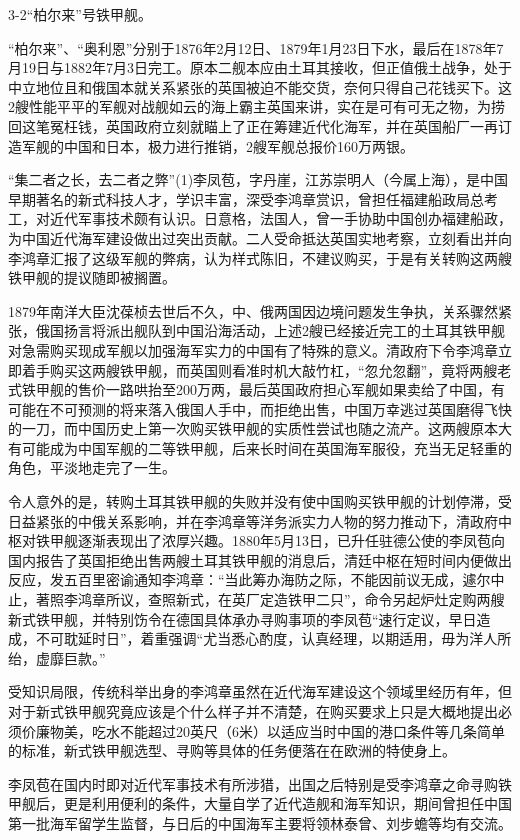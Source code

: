 \documentclass[12pt,UTF8]{ctexbook}
\begin{document}
3-2“柏尔来”号铁甲舰。

“柏尔来”、“奥利恩”分别于1876年2月12日、1879年1月23日下水，最后在1878年7月19日与1882年7月3日完工。原本二舰本应由土耳其接收，但正值俄土战争，处于中立地位且和俄国本就关系紧张的英国被迫不能交货，奈何只得自己花钱买下。这2艘性能平平的军舰对战舰如云的海上霸主英国来讲，实在是可有可无之物，为捞回这笔冤枉钱，英国政府立刻就瞄上了正在筹建近代化海军，并在英国船厂一再订造军舰的中国和日本，极力进行推销，2艘军舰总报价160万两银。

“集二者之长，去二者之弊”(1)李凤苞，字丹崖，江苏崇明人（今属上海），是中国早期著名的新式科技人才，学识丰富，深受李鸿章赏识，曾担任福建船政局总考工，对近代军事技术颇有认识。日意格，法国人，曾一手协助中国创办福建船政，为中国近代海军建设做出过突出贡献。二人受命抵达英国实地考察，立刻看出并向李鸿章汇报了这级军舰的弊病，认为样式陈旧，不建议购买，于是有关转购这两艘铁甲舰的提议随即被搁置。

1879年南洋大臣沈葆桢去世后不久，中、俄两国因边境问题发生争执，关系骤然紧张，俄国扬言将派出舰队到中国沿海活动，上述2艘已经接近完工的土耳其铁甲舰对急需购买现成军舰以加强海军实力的中国有了特殊的意义。清政府下令李鸿章立即着手购买这两艘铁甲舰，而英国则看准时机大敲竹杠，“忽允忽翻”，竟将两艘老式铁甲舰的售价一路哄抬至200万两，最后英国政府担心军舰如果卖给了中国，有可能在不可预测的将来落入俄国人手中，而拒绝出售，中国万幸逃过英国磨得飞快的一刀，而中国历史上第一次购买铁甲舰的实质性尝试也随之流产。这两艘原本大有可能成为中国军舰的二等铁甲舰，后来长时间在英国海军服役，充当无足轻重的角色，平淡地走完了一生。

令人意外的是，转购土耳其铁甲舰的失败并没有使中国购买铁甲舰的计划停滞，受日益紧张的中俄关系影响，并在李鸿章等洋务派实力人物的努力推动下，清政府中枢对铁甲舰逐渐表现出了浓厚兴趣。1880年5月13日，已升任驻德公使的李凤苞向国内报告了英国拒绝出售两艘土耳其铁甲舰的消息后，清廷中枢在短时间内便做出反应，发五百里密谕通知李鸿章：“当此筹办海防之际，不能因前议无成，遽尔中止，著照李鸿章所议，查照新式，在英厂定造铁甲二只”，命令另起炉灶定购两艘新式铁甲舰，并特别饬令在德国具体承办寻购事项的李凤苞“速行定议，早日造成，不可耽延时日”，着重强调“尤当悉心酌度，认真经理，以期适用，毋为洋人所绐，虚靡巨款。”

受知识局限，传统科举出身的李鸿章虽然在近代海军建设这个领域里经历有年，但对于新式铁甲舰究竟应该是个什么样子并不清楚，在购买要求上只是大概地提出必须价廉物美，吃水不能超过20英尺（6米）以适应当时中国的港口条件等几条简单的标准，新式铁甲舰选型、寻购等具体的任务便落在在欧洲的特使身上。

李凤苞在国内时即对近代军事技术有所涉猎，出国之后特别是受李鸿章之命寻购铁甲舰后，更是利用便利的条件，大量自学了近代造舰和海军知识，期间曾担任中国第一批海军留学生监督，与日后的中国海军主要将领林泰曾、刘步蟾等均有交流。
\end{document}
